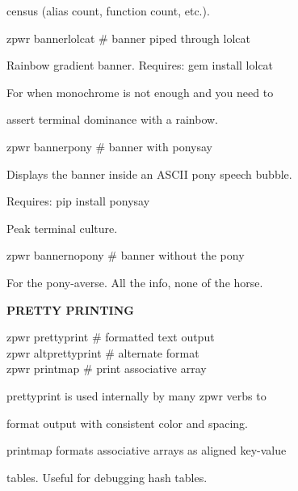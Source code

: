 \documentclass[11pt,a4paper,twoside]{book}
\begin{document}
census (alias count, function count, etc.).

\begin{codebox}
zpwr bannerlolcat                   \# banner piped through lolcat\\
\end{codebox}

Rainbow gradient banner. Requires: gem install lolcat

For when monochrome is not enough and you need to

assert terminal dominance with a rainbow.

\begin{codebox}
zpwr bannerpony                     \# banner with ponysay\\
\end{codebox}

Displays the banner inside an ASCII pony speech bubble.

\begin{codebox}
Requires: pip install ponysay\\
\end{codebox}

Peak terminal culture.

\begin{codebox}
zpwr bannernopony                   \# banner without the pony\\
\end{codebox}

For the pony-averse. All the info, none of the horse.


\vspace{12pt}
{\bfseries\color{neonyellow} PRETTY PRINTING}\vspace{4pt}

\begin{codebox}
zpwr prettyprint                    \# formatted text output\\
zpwr altprettyprint                 \# alternate format\\
zpwr printmap                       \# print associative array\\
\end{codebox}

prettyprint is used internally by many zpwr verbs to

format output with consistent color and spacing.

printmap formats associative arrays as aligned key-value

tables. Useful for debugging hash tables.
\end{document}
